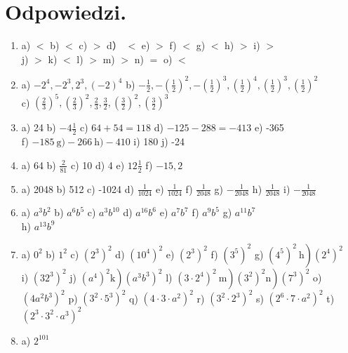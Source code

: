 \documentclass[10pt]{article}
\begin{document}
\section*{Odpowiedzi.}
\begin{enumerate}
  \item a) \(<\) b) \(<\) c) \(>\) d） \(<\) e) \(>\) f) \(<\) g) \(<\) h) \(>\) i) \(>\)\\
j) \(>\) k) \(<\) l) \(>\) m) \(>\) n) \(=\) o) \(<\)
  \item a) \(-2^{4},-2^{3}, 2^{3},(-2)^{4}\) b) \(-\frac{1}{2},-\left(\frac{1}{2}\right)^{2},-\left(\frac{1}{2}\right)^{3},\left(\frac{1}{2}\right)^{4},\left(\frac{1}{2}\right)^{3},\left(\frac{1}{2}\right)^{2}\)\\
c) \(\left(\frac{2}{3}\right)^{5},\left(\frac{2}{3}\right)^{2}, \frac{2}{3}, \frac{3}{2},\left(\frac{3}{2}\right)^{2},\left(\frac{3}{2}\right)^{3}\)
  \item a) 24 b) \(-4 \frac{1}{2}\) c) \(64+54=118\) d) \(-125-288=-413\) e) -365\\
f) \(-185 \mathrm{~g})-266 \mathrm{~h})-410\) i) 180 j) -24
  \item a) 64 b) \(\frac{2}{81}\) c) 10 d) 4 e) \(12 \frac{1}{2}\) f) \(-15,2\)
  \item a) 2048 b) 512 c) -1024 d) \(\frac{1}{1024}\) e) \(\frac{1}{1024}\) f) \(\frac{1}{2048}\) g) \(-\frac{1}{2048}\) h) \(\frac{1}{2048}\) i) \(-\frac{1}{2048}\)
  \item a) \(a^{3} b^{2}\) b) \(a^{6} b^{5}\) c) \(a^{3} b^{10}\) d) \(a^{16} b^{6}\) e) \(a^{7} b^{7}\) f) \(a^{9} b^{5}\) g) \(a^{11} b^{7}\)\\
h) \(a^{13} b^{9}\)
  \item a) \(0^{2}\) b) \(1^{2}\) c) \(\left(2^{3}\right)^{2}\) d) \(\left(10^{4}\right)^{2}\) e) \(\left(2^{3}\right)^{2}\) f) \(\left(3^{5}\right)^{2}\) g) \(\left.\left(4^{5}\right)^{2} \mathrm{~h}\right)\left(2^{4}\right)^{2}\)\\
i) \(\left(32^{3}\right)^{2}\) j) \(\left.\left(a^{4}\right)^{2} \mathrm{k}\right)\left(a^{3} b^{3}\right)^{2}\) l) \(\left.\left.\left(3 \cdot 2^{4}\right)^{2} \mathrm{~m}\right)\left(3^{2}\right)^{2} \mathrm{n}\right)\left(7^{3}\right)^{2}\) o) \(\left(4 a^{2} b^{3}\right)^{2}\) p) \(\left(3^{2} \cdot 5^{3}\right)^{2}\) q) \(\left(4 \cdot 3 \cdot a^{2}\right)^{2}\) r) \(\left(3^{2} \cdot 2^{3}\right)^{2}\) s) \(\left(2^{6} \cdot 7 \cdot a^{2}\right)^{2}\) t) \(\left(2^{3} \cdot 3^{2} \cdot a^{3}\right)^{2}\)
  \item a) \(2^{101}\)\\

\end{enumerate}
\end{document}
